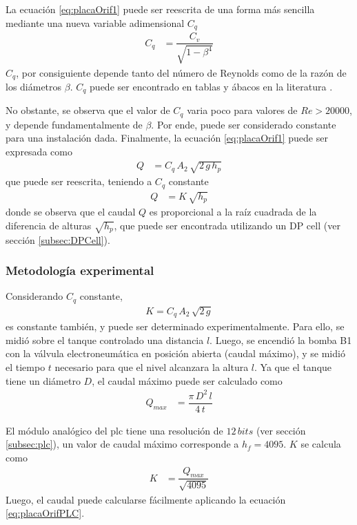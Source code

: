La ecuación \eqref{eq:placaOrif1} puede ser reescrita de una forma más sencilla
mediante una nueva variable adimensional $C_q$
\begin{align}
 C_q &= \dfrac{C_v}{\sqrt{1-\beta^4}}
\end{align}
$C_q$, por consiguiente depende tanto del número de Reynolds como de la razón
de los diámetros $\beta$. $C_q$ puede ser encontrado en tablas y ábacos en la
literatura \cite{bib:Mataix}.

No obstante, se observa que el valor de $C_q$ varia poco para valores de
$Re > 20000$, y depende fundamentalmente de $\beta$.
Por ende, puede ser considerado constante para una instalación dada.
Finalmente, la ecuación \eqref{eq:placaOrif1} puede ser expresada como
\begin{align}
 Q &= C_q\,A_2\, \sqrt{2\,g\,h_p}
\end{align}
que puede ser reescrita, teniendo a $C_q$ constante
\begin{align}
 Q &= K\,\sqrt{h_p}
 \label{eq:placaOrifPLC}
\end{align}
donde se observa que el caudal $Q$ es proporcional a la raíz cuadrada de
la diferencia de alturas $\sqrt{h_p}$, que puede
ser encontrada utilizando un DP cell (ver sección \ref{subsec:DPCell}).

\subsubsection{Metodología experimental}
Considerando $C_q$ constante,
\begin{align}
 K = C_q\, A_2\, \sqrt{2\,g}
\end{align}
es constante también, y puede ser determinado experimentalmente.
Para ello, se midió sobre el tanque controlado una distancia $l$.
Luego, se encendió la bomba B1 con la válvula electroneumática en posición
abierta (caudal máximo), y se midió el tiempo $t$ necesario para que el nivel
alcanzara la altura $l$.
Ya que el tanque tiene un diámetro $D$, el caudal máximo puede ser
calculado como
\begin{align}
 Q_{max} &= \dfrac{\pi\,D^2\,l}{4\,t}
\end{align}

El módulo analógico del \gls{plc} tiene una resolución de $12\,bits$
(ver sección \ref{subsec:plc}), un valor de caudal máximo corresponde a $h_f =
4095$.
$K$ se calcula como
\begin{align}
 K &= \dfrac{Q_{max}}{\sqrt{4095}}
\end{align}
Luego, el caudal puede calcularse fácilmente aplicando la ecuación
\eqref{eq:placaOrifPLC}.

